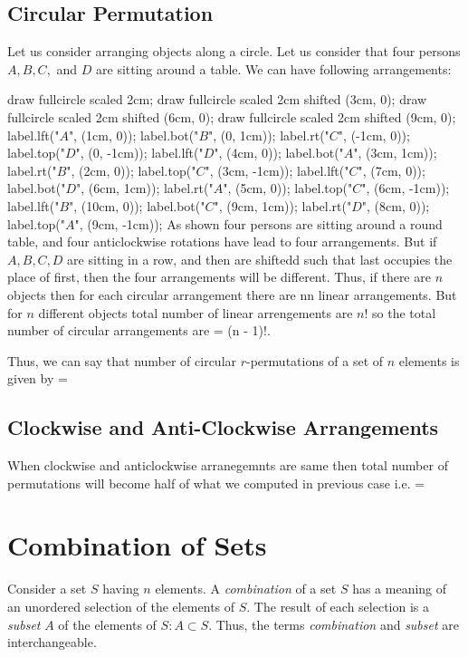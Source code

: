\subsection{Circular Permutation}
Let us consider arranging objects along a circle. Let us consider that four persons $A, B, C,$ and $D$ are sitting around a table. We
can have following arrangements:

\startplacefigure[location=force]
  \startMPcode
    draw fullcircle scaled 2cm;
    draw fullcircle scaled 2cm shifted (3cm, 0);
    draw fullcircle scaled 2cm shifted (6cm, 0);
    draw fullcircle scaled 2cm shifted (9cm, 0);
    label.lft("$A$", (1cm, 0));
    label.bot("$B$", (0, 1cm));
    label.rt("$C$", (-1cm, 0));
    label.top("$D$", (0, -1cm));
    label.lft("$D$", (4cm, 0));
    label.bot("$A$", (3cm, 1cm));
    label.rt("$B$", (2cm, 0));
    label.top("$C$", (3cm, -1cm));
    label.lft("$C$", (7cm, 0));
    label.bot("$D$", (6cm, 1cm));
    label.rt("$A$", (5cm, 0));
    label.top("$C$", (6cm, -1cm));
    label.lft("$B$", (10cm, 0));
    label.bot("$C$", (9cm, 1cm));
    label.rt("$D$", (8cm, 0));
    label.top("$A$", (9cm, -1cm));
  \stopMPcode
\stopplacefigure
As shown four persons are sitting around a round table, and four anticlockwise rotations have lead to four arrangements. But if
$A,B,C,D$ are sitting in a row, and then are shiftedd such that last occupies the place of first, then the four arrangements will be
different. Thus, if there are $n$ objects then for each circular arrangement there are nn linear arrangements. But for $n$ different
objects total number of linear arrengements are $n!$ so the total number of circular arrangements are \startformula {} = (n - 1)!.\stopformula

Thus, we can say that number of circular $r$-permutations of a set of $n$ elements is given by \startformula {} = \stopformula

\subsection{Clockwise and Anti-Clockwise Arrangements}
When clockwise and anticlockwise arranegemnts are same then total number of permutations will become half of what we computed in
previous case i.e. \startformula {} = \stopformula

\section{Combination of Sets}
Consider a set $S$ having $n$ elements. A {\it combination} of a set $S$ has a meaning of an unordered selection of the elements
of $S$. The result of each selection is a {\it subset} $A$ of the elements of $S: A\subset S$. Thus, the terms
{\it combination} and {\it subset} are interchangeable.

